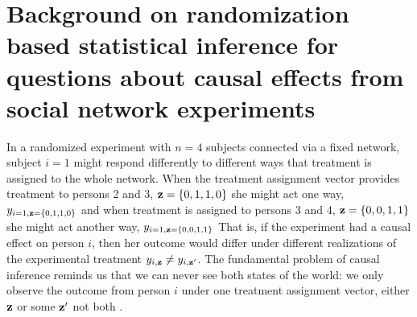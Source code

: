 

\section{Background on randomization based statistical inference for questions
about causal effects from social network experiments}

In a randomized experiment with $n=4$ subjects connected via a fixed network,
subject $i=1$ might respond differently to different ways that treatment is
assigned to the whole network. When the treatment assignment vector provides
treatment to persons 2 and 3, $\mathbf{z}=\{0,1,1,0\}$ she might act one way,
$y_{i=1,\mathbf{z}=\{0,1,1,0\}}$ and when treatment is assigned to persons 3 and 4,
$\mathbf{z}=\{0,0,1,1\}$ she might act another way, $y_{i=1,\mathbf{z}=\{0,0,1,1\}}$ That
is, if the experiment had a causal effect on person $i$, then her outcome
would differ under different realizations of the experimental treatment
$y_{i,\mathbf{z}} \ne y_{i,\mathbf{z}'}$. The fundamental problem of causal inference
reminds us that we can never see both states of the world: we only observe the
outcome from person $i$ under one treatment assignment vector, either $\mathbf{z}$ or
some $\mathbf{z}'$ not both  \cite{holland:1986a}.


